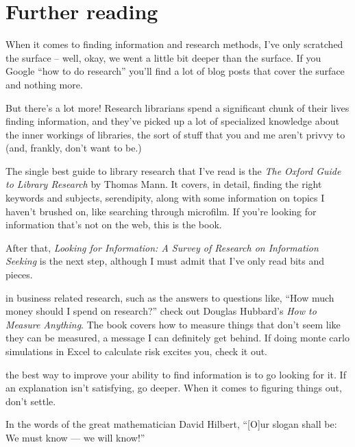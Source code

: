 \section{Further reading}

When it comes to finding information and research methods, I've only scratched
the surface -- well, okay, we went a little bit deeper than the surface. If you
Google ``how to do research'' you'll find a lot of blog posts that cover the
surface and nothing more.

But there's a lot more! Research librarians spend a significant chunk of their
lives finding information, and they've picked up a lot of specialized
knowledge about the inner workings of libraries, the sort of stuff that you and
me aren't privvy to (and, frankly, don't want to be.)

The single best guide to library research that I've read is the \textit{The
  Oxford Guide to Library Research} by Thomas Mann. It covers, in detail,
finding the right keywords and subjects, serendipity, along with some
information on topics I haven't brushed on, like searching through
microfilm. If you're looking for information that's not on the web, this is the
book.

After that, \textit{Looking for Information: A Survey of Research on Information
  Seeking} is the next step, although I must admit that I've only read bits and
pieces.

 in business related research, such as the
answers to questions like, ``How much money should I spend on research?'' check
out Douglas Hubbard's \textit{How to Measure Anything}. The book covers how to
measure things that don't seem like they can be measured, a message I can
definitely get behind. If doing monte carlo simulations in Excel to calculate
risk excites you, check it out.

 the best way to improve your ability to find
information is to go looking for it. If an explanation isn't satisfying, go
deeper. When it comes to figuring things out, don't settle.

In the words of the great mathematician David Hilbert, ``[O]ur slogan shall be:
We must know — we will know!''

